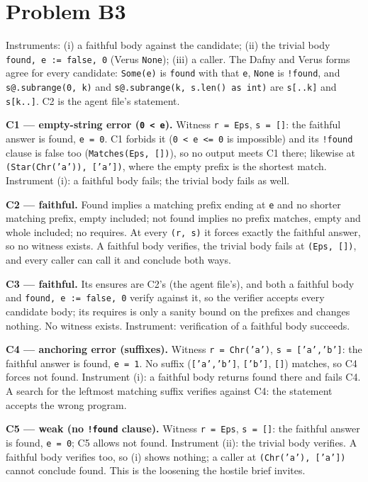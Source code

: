 \documentclass[11pt]{article}
\begin{document}
\section*{Problem B3}\label{ans:B3}
\begin{answer}
Instruments: (i) a faithful body against the candidate; (ii) the trivial body
\texttt{found, e := false, 0} (Verus \texttt{None}); (iii) a caller. The Dafny
and Verus forms agree for every candidate: \texttt{Some(e)} is
\texttt{found} with that \texttt{e}, \texttt{None} is \texttt{!found}, and
\texttt{s@.subrange(0, k)} and \texttt{s@.subrange(k, s.len() as int)} are
\texttt{s[..k]} and \texttt{s[k..]}. C2 is the agent file's statement.

\textbf{C1 --- empty-string error (\texttt{0 < e}).} Witness \texttt{r = Eps},
\texttt{s = []}: the faithful answer is found, \texttt{e = 0}. C1 forbids it
(\texttt{0 < e <= 0} is impossible) and its \texttt{!found} clause is false too
(\texttt{Matches(Eps, [])}), so no output meets C1 there; likewise at
\texttt{(Star(Chr('a')), ['a'])}, where the empty prefix is the shortest
match. Instrument (i): a faithful body fails; the trivial body fails as well.

\textbf{C2 --- faithful.} Found implies a matching prefix ending at
\texttt{e} and no shorter matching prefix, empty included; not found implies
no prefix matches, empty and whole included; no requires. At every
\texttt{(r, s)} it forces exactly the faithful answer, so no witness exists. A
faithful body verifies, the trivial body fails at \texttt{(Eps, [])}, and every
caller can call it and conclude both ways.

\textbf{C3 --- faithful.} Its ensures are C2's (the agent file's), and both a
faithful body and \texttt{found, e := false, 0} verify against it, so the
verifier accepts every candidate body; its requires is only a sanity bound on
the prefixes and changes nothing. No witness exists. Instrument: verification
of a faithful body succeeds.

\textbf{C4 --- anchoring error (suffixes).} Witness \texttt{r = Chr('a')},
\texttt{s = ['a','b']}: the faithful answer is found, \texttt{e = 1}. No
suffix (\texttt{['a','b']}, \texttt{['b']}, \texttt{[]}) matches, so C4 forces
not found. Instrument (i): a faithful body returns found there and fails C4. A
search for the leftmost matching suffix verifies against C4: the statement
accepts the wrong program.

\textbf{C5 --- weak (no \texttt{!found} clause).} Witness \texttt{r = Eps},
\texttt{s = []}: the faithful answer is found, \texttt{e = 0}; C5 allows not
found. Instrument (ii): the trivial body verifies. A faithful body verifies
too, so (i) shows nothing; a caller at \texttt{(Chr('a'), ['a'])} cannot
conclude found. This is the loosening the hostile brief invites.


\end{answer}
\end{document}
